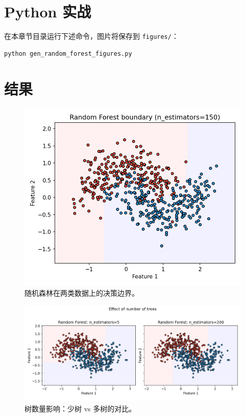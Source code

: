 \documentclass[UTF8,zihao=-4]{ctexart}
\begin{document}
\section{Python 实战}
在本章节目录运行下述命令，图片将保存到 \texttt{figures/}：
\begin{lstlisting}[style=code,caption={生成随机森林配图},label={lst:genfigs_rf_cn}]
python gen_random_forest_figures.py
\end{lstlisting}



\section{结果}
\begin{figure}[H]
  \centering
  \includegraphics[width=0.9\linewidth]{rf_decision_boundary_2class.png}
  \caption{随机森林在两类数据上的决策边界。}
  \label{fig:rf2_cn}
\end{figure}
\FloatBarrier

\begin{figure}[H]
  \centering
  \includegraphics[width=0.95\linewidth]{rf_n_estimators_compare.png}
  \caption{树数量影响：少树 vs 多树的对比。}
  \label{fig:rf_n_cn}
\end{figure}
\FloatBarrier
\end{document}
